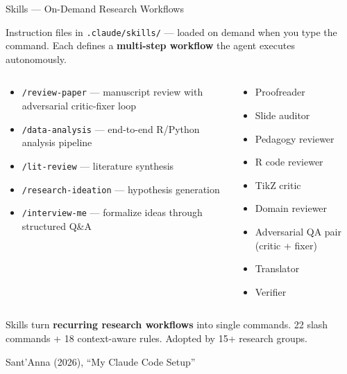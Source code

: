 \documentclass[aspectratio=169, 11pt]{beamer}
\newcommand{\emphgold}[1]{\alert{\textbf{#1}}}
\newcommand{\sourceref}[1]{\vspace{0.15cm}\hfill{\tiny\textcolor{medgray}{#1}}}
\begin{document}
\begin{frame}[shrink=35]{Skills --- On-Demand Research Workflows}
\begin{keyinsight}
Instruction files in \texttt{.claude/skills/} --- loaded on demand when you type the command. Each defines a \emphgold{multi-step workflow} the agent executes autonomously.
\end{keyinsight}
\vspace{0.1cm}
\begin{columns}[T]
\begin{keyinsight}
\begin{itemize}
  \item \texttt{/review-paper} --- manuscript review with adversarial critic-fixer loop
  \item \texttt{/data-analysis} --- end-to-end R/Python analysis pipeline
  \item \texttt{/lit-review} --- literature synthesis
  \item \texttt{/research-ideation} --- hypothesis generation
  \item \texttt{/interview-me} --- formalize ideas through structured Q\&A
\end{itemize}
\end{keyinsight}

\begin{keyinsight}
\scriptsize
\begin{itemize}
  \item Proofreader
  \item Slide auditor
  \item Pedagogy reviewer
  \item R code reviewer
  \item TikZ critic
  \item Domain reviewer
  \item Adversarial QA pair (critic + fixer)
  \item Translator
  \item Verifier
\end{itemize}
\end{keyinsight}
\end{columns}
\vspace{0.1cm}
\begin{center}
\small Skills turn \emphgold{recurring research workflows} into single commands. 22 slash commands + 18 context-aware rules. Adopted by 15+ research groups.
\end{center}
\sourceref{Sant'Anna (2026), ``My Claude Code Setup''}
\end{frame}
\end{document}
